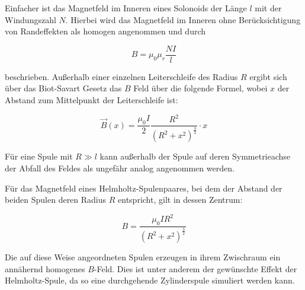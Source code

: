 Einfacher ist das Magnetfeld im Inneren eines Solonoids der Länge $l$ 
mit der Windungszahl $N$. Hierbei wird das Magnetfeld im Inneren ohne
Berücksichtigung von Randeffekten als homogen angenommen und durch 

\begin{equation}
    \label{eqn:bhom}
    B = \mu_0 \mu_r \frac{NI}l 
\end{equation}

beschrieben. Außerhalb einer einzelnen Leiterschleife des Radius $R$ ergibt sich über das 
Biot-Savart Gesetz das $B$ Feld über die folgende Formel, wobei $x$ der Abstand zum Mittelpunkt
der Leiterschleife ist:

\begin{equation}
    \label{eqn:bvonx}
    \vec B(x)= \frac{\mu_0 I}{2} \frac{R^2}{(R^2 + x^2)^\frac{3}2}\cdot x
\end{equation}

Für eine Spule mit $R \gg l$ kann außerhalb der Spule auf deren Symmetrieachse der Abfall des Feldes 
als ungefähr analog angenommen werden.

Für das Magnetfeld eines Helmholtz-Spulenpaares, bei dem der Abstand der beiden 
Spulen deren Radius $R$ entspricht, gilt in dessen Zentrum:

\begin{equation}
    \label{eqn:bhelmholtz}
    B = \frac{\mu_0 I R^2}{({R^2}+{x^2})^\frac{3}2}
\end{equation}

Die auf diese Weise angeordneten Spulen erzeugen in ihrem Zwischraum ein annähernd homogenes $B$-Feld.
Dies ist unter anderem der gewünschte Effekt der Helmholtz-Spule, da so eine durchgehende Zylinderspule
simuliert werden kann.

